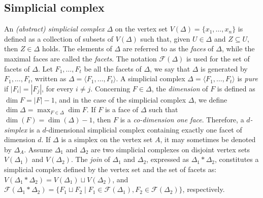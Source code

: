 \documentclass[12pt,reqno]{amsart}
\theoremstyle{definition}
\def\F{\mathcal{F}}
\def\l{\langle}
\def\r{\rangle}
\begin{document}
    \subsection{Simplicial complex} 
	An {\it (abstract) simplicial complex} $\Delta$ on the vertex set $V(\Delta)=\{x_1,\ldots,x_n\}$ is defined as a collection of subsets of $V(\Delta)$ such that, given $U\in \Delta$ and $Z\subseteq U$, then $Z\in \Delta$ holds. 
	The elements of $\Delta$ are referred to as the {\it faces} of $\Delta$, while the maximal faces are called the {\it facets}. 
	The notation $\mathcal F(\Delta)$ is used for the set of facets of $\Delta$. 
	Let $F_1,\ldots, F_t$ be all the facets of $\Delta$, we say that $\Delta$ is generated by $F_1,\ldots, F_t$, written as $\Delta=\langle F_1,\ldots, F_t \rangle$. 
	A simplicial complex $\Delta=\l F_1,\ldots,F_t\r$ is {\it pure} if $|F_i|=|F_j|$, for every $i\neq j$. 
	Concerning $F\in\Delta$, the {\it dimension} of $F$ is defined as $\dim F=|F|-1$, and in the case of the simplicial complex $\Delta$, we define $\dim\Delta=\max_{F\in \Delta}\dim F$. 
	If $F$ is a face of $\Delta$ such that $\dim(F)=\dim(\Delta)-1$, then $F$ is a {\it co-dimension one face}. 
	Therefore, a {\it $d$-simplex} is a $d$-dimensional simplicial complex containing exactly one facet of dimension $d$.
	If $\Delta$ is a simplex on the vertex set $A$, it may sometimes be denoted by $\Delta_{A}$. 
	Assume $\Delta_1$ and $\Delta_2$ are two simplicial complexes on disjoint vertex sets $V(\Delta_1)$ and $V(\Delta_2)$. 
	The {\it join} of $\Delta_1$ and $\Delta_2$, expressed as $\Delta_1*\Delta_2$, constitutes a simplicial complex defined by the vertex set and the set of facets as: $V(\Delta_1*\Delta_2)=V(\Delta_1)\sqcup V(\Delta_2)$, and $\F(\Delta_1*\Delta_2)=\{F_1\sqcup F_2\mid F_1\in\F(\Delta_1),F_2\in\F(\Delta_2)\}$, respectively.
	
\end{document}
